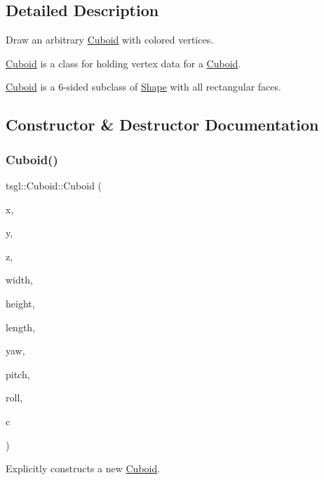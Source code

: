 \subsection{Detailed Description}
Draw an arbitrary \hyperlink{classtsgl_1_1_cuboid}{Cuboid} with colored vertices. 

\hyperlink{classtsgl_1_1_cuboid}{Cuboid} is a class for holding vertex data for a \hyperlink{classtsgl_1_1_cuboid}{Cuboid}.

\hyperlink{classtsgl_1_1_cuboid}{Cuboid} is a 6-\/sided subclass of \hyperlink{classtsgl_1_1_shape}{Shape} with all rectangular faces. 

\subsection{Constructor \& Destructor Documentation}
\mbox{\label{classtsgl_1_1_cuboid_ac6fae2d4edcb10ea1478c840012f5c2a}} 
\subsubsection{\texorpdfstring{Cuboid()}{Cuboid()}\hspace{0.1cm}{\footnotesize\ttfamily [1/2]}}
{\footnotesize\ttfamily tsgl\+::\+Cuboid\+::\+Cuboid (\begin{DoxyParamCaption}\item[{float}]{x,  }\item[{float}]{y,  }\item[{float}]{z,  }\item[{G\+Lfloat}]{width,  }\item[{G\+Lfloat}]{height,  }\item[{G\+Lfloat}]{length,  }\item[{float}]{yaw,  }\item[{float}]{pitch,  }\item[{float}]{roll,  }\item[{\hyperlink{structtsgl_1_1_color_float}{Color\+Float}}]{c }\end{DoxyParamCaption})}



Explicitly constructs a new \hyperlink{classtsgl_1_1_cuboid}{Cuboid}. 

